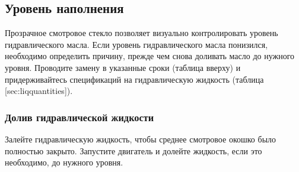 
\subsection[niveau_hydrau]{Уровень наполнения}

Прозрачное смотровое стекло позволяет визуально контролировать уровень гидравлического масла.
Если уровень гидравлического масла понизился, необходимо определить причину, прежде чем снова доливать масло до нужного уровня. Проводите замену в указанные сроки (таблица вверху) и придерживайтесь спецификаций на гидравлическую жидкость (таблица [sec:liqquantities]).


\subsubsection{Долив гидравлической жидкости}

Залейте гидравлическую жидкость, чтобы среднее смотровое окошко было полностью закрыто.
Запустите двигатель и долейте жидкость, если это необходимо, до нужного уровня.
